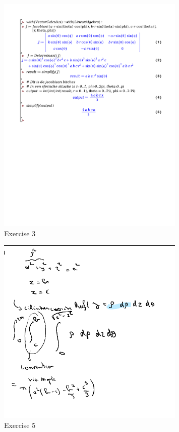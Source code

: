 \documentclass[a4paper]{report}
\begin{document}
\begin{figure}[H]
	\centering
	\includegraphics[width=0.8\textwidth]{exercises/huis_5_ex_3.pdf}
	\caption{Exercise 3}
	\label{fig:huis_5_ex_3}
\end{figure}

\begin{figure}[H]
	\centering
	\includegraphics[width=0.8\textwidth]{assets/huis_5_ex_5.png}
	\caption{Exercise 5}
	\label{fig:huis_5_ex_5}
\end{figure}
\end{document}
